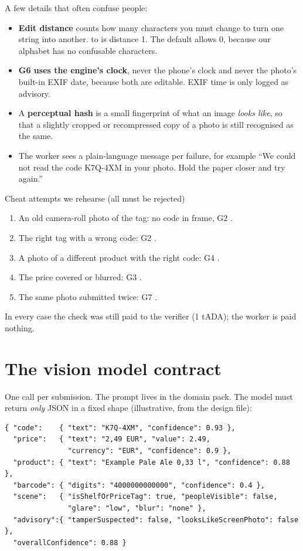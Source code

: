 A few details that often confuse people:
\begin{itemize}
  \item \textbf{Edit distance} counts how many characters you must change to turn one string into another.  to  is distance 1. The default allows 0, because our alphabet has no confusable characters.
  \item \textbf{G6 uses the engine's clock}, never the phone's clock and never the photo's built-in EXIF date, because both are editable. EXIF time is only logged as advisory.
  \item A \textbf{perceptual hash} is a small fingerprint of what an image \emph{looks like}, so that a slightly cropped or recompressed copy of a photo is still recognised as the same.
  \item The worker sees a plain-language message per failure, for example ``We could not read the code K7Q-4XM in your photo. Hold the paper closer and try again.''
\end{itemize}

\begin{examplebox}{Cheat attempts we rehearse (all must be rejected)}
\begin{enumerate}
  \item An old camera-roll photo of the tag: no code in frame, G2 .
  \item The right tag with a wrong code: G2 .
  \item A photo of a different product with the right code: G4 .
  \item The price covered or blurred: G3 .
  \item The same photo submitted twice: G7 .
\end{enumerate}
In every case the check was still paid to the verifier (1 tADA); the worker is paid nothing.
\end{examplebox}

\section{The vision model contract}
One call per submission. The prompt lives in the domain pack. The model must return \emph{only} JSON in a fixed shape (illustrative, from the design file):

\begin{lstlisting}
{ "code":    { "text": "K7Q-4XM", "confidence": 0.93 },
  "price":   { "text": "2,49 EUR", "value": 2.49,
               "currency": "EUR", "confidence": 0.9 },
  "product": { "text": "Example Pale Ale 0,33 l", "confidence": 0.88 },
  "barcode": { "digits": "4000000000000", "confidence": 0.4 },
  "scene":   { "isShelfOrPriceTag": true, "peopleVisible": false,
               "glare": "low", "blur": "none" },
  "advisory":{ "tamperSuspected": false, "looksLikeScreenPhoto": false },
  "overallConfidence": 0.88 }
\end{lstlisting}

